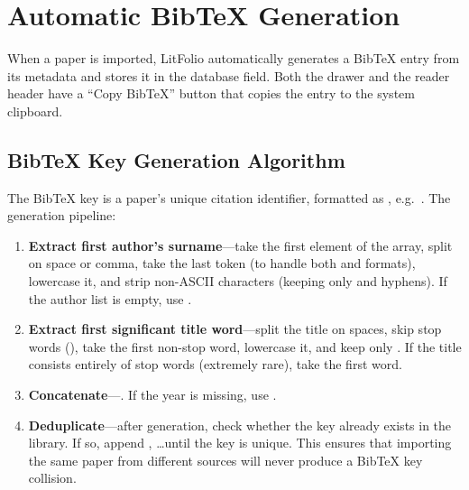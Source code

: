 \section{Automatic BibTeX Generation}

When a paper is imported, LitFolio automatically generates a BibTeX entry from its
metadata and stores it in the  database field. Both the drawer and the
reader header have a ``Copy BibTeX'' button that copies the entry to the system
clipboard.


\subsection{BibTeX Key Generation Algorithm}

The BibTeX key is a paper's unique citation identifier, formatted as
,
e.g.\ . The generation pipeline:

\begin{enumerate}
  \item \textbf{Extract first author's surname}---take the first element of the
     array, split on space or comma, take the last token (to handle both
     and  formats), lowercase it,
    and strip non-ASCII characters (keeping only  and hyphens). If the
    author list is empty, use .
  \item \textbf{Extract first significant title word}---split the title on spaces,
    skip stop words (),
    take the first non-stop word, lowercase it, and keep only . If the
    title consists entirely of stop words (extremely rare), take the first word.
  \item \textbf{Concatenate}---. If the year is
    missing, use .
  \item \textbf{Deduplicate}---after generation, check whether the key already exists
    in the library. If so, append , \ldots until the key is unique.
    This ensures that importing the same paper from different sources will never
    produce a BibTeX key collision.
\end{enumerate}


